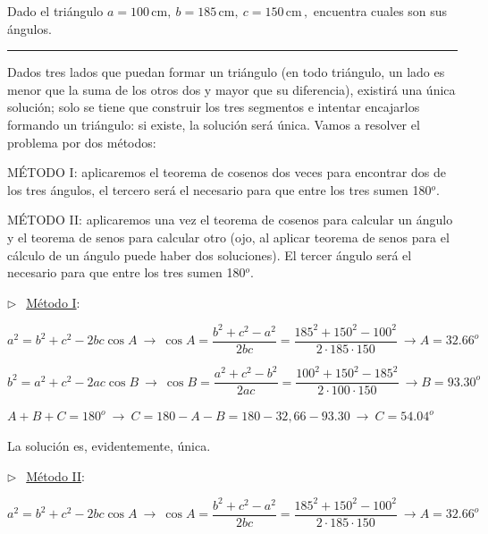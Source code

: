 \begin{miejercicio}

Dado el triángulo $a=100 \, \mathrm{cm},\ b=185 \,  \mathrm{cm},\ c= 150 \,  \mathrm{cm}\, , $ encuentra cuales son sus ángulos.

\rule{250pt}{0.1pt}

\vspace{2mm} Dados tres lados que puedan formar un triángulo \textcolor{gris}{(en todo triángulo, un lado es menor que la suma de los otros dos y mayor que su diferencia)}, existirá una única solución; solo se tiene que construir los tres segmentos e intentar encajarlos formando un triángulo: si existe, la solución será única. Vamos a resolver el problema por dos métodos:

\vspace{2mm} MÉTODO I: aplicaremos el teorema de cosenos dos veces para encontrar dos de los tres ángulos, el tercero será el necesario para que entre los tres sumen 180$^o$.

\vspace{2mm} MÉTODO II: aplicaremos una vez el teorema de cosenos para calcular un ángulo y el teorema de senos para calcular otro (ojo, al aplicar teorema de senos para el cálculo de un ángulo puede haber dos soluciones). El tercer ángulo será el necesario para que entre los tres sumen 180$^o$.

\vspace{4mm} $\triangleright \ \ $ \underline{Método I}: 

\vspace{2mm} $a^2=b^2+c^2-2bc\cos A\ \to \ \cos A=\dfrac{b^2+c^2-a^2}{2bc}=\dfrac{185^2+150^2-100^2}{2\cdot 185\cdot 150} \ \to  A=32.66^o$

\vspace{2mm} $b^2=a^2+c^2-2ac\cos B\ \to \ \cos B=\dfrac{a^2+c^2-b^2}{2ac}=\dfrac{100^2+150^2-185^2}{2\cdot 100\cdot 150} \ \to  B=93.30^o$

\vspace{2mm} $A+B+C=180^o \ \to \ C=180-A-B=180-32,66-93.30 \ \to \ C=54.04^o$

\vspace{2mm} La solución es, evidentemente, única.


\vspace{4mm} $\triangleright \ \ $ \underline{Método II}: 

\vspace{2mm} $a^2=b^2+c^2-2bc\cos A\ \to \ \cos A=\dfrac{b^2+c^2-a^2}{2bc}=\dfrac{185^2+150^2-100^2}{2\cdot 185\cdot 150} \ \to  A=32.66^o$


\end{miejercicio}
